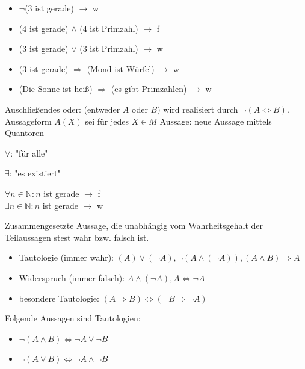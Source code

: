 \begin{exmpn}
	\begin{itemize}
		\item $\lnot$(3 ist gerade) $\to$ w
		\item (4 ist gerade) $\land$ (4 ist Primzahl) $\to$ f
		\item (3 ist gerade) $\lor$ (3 ist Primzahl) $\to$ w
		\item (3 ist gerade) $\Rightarrow$ (Mond ist Würfel) $\to$ w
		\item (Die Sonne ist heiß) $\Rightarrow$ (es gibt Primzahlen) $\to$ w
	\end{itemize}
\end{exmpn}

\noindent Auschließendes oder: (entweder $A$ oder $B$) wird realisiert durch $\lnot(A \iff B)$.\\
Aussageform $A(X)$ sei f\"ur jedes $X \in M$ Aussage: neue Aussage mittels Quantoren

\begin{compactitem}
	\item $\forall$: "für alle"
	\item $\exists$: "es existiert"
\end{compactitem}

\begin{exmpn}
	$\forall n \in \mathbb{N}: n$ ist gerade $\to$ f\\
	$\exists n \in \mathbb{N}: n$ ist gerade $\to$ w 
\end{exmpn}

\begin{mydef}
	Zusammengesetzte Aussage, die unabhängig vom Wahrheitsgehalt der Teilaussagen stest wahr bzw. falsch ist.
\end{mydef}

\begin{exmpn}
	\begin{itemize}
		\item Tautologie (immer wahr): 
		$(A) \lor (\lnot A), \lnot (A  \land (\lnot A)), (A \land B) \Rightarrow A$
		\item Widerspruch (immer falsch): $A \land (\lnot A), A \iff \lnot A$  
		\item besondere Tautologie: $(A \Rightarrow B) \iff (\lnot B \Rightarrow \lnot A)$
	\end{itemize}
\end{exmpn}

\begin{satz}
	Folgende Aussagen sind Tautologien:
	\begin{itemize}{ }
		\item $\lnot(A \land B) \iff \lnot A \lor \lnot B$
		\item $\lnot(A \lor B) \iff \lnot A \land \lnot B$
	\end{itemize}
\end{satz}

